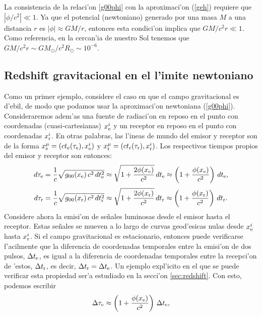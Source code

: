 La consistencia de la relaci'on \eqref{g00phi} con la aproximaci'on (\ref{geh}) requiere que $|{\phi}/{c^2}|\ll 1$. Ya que el potencial (newtoniano) generado por una masa $M$ a una distancia $r$ es $|\phi|\approx {GM}/{r}$, entonces esta condici'on implica que ${GM}/{c^2r}\ll 1$. Como referencia, en la cercan'ia de nuestro Sol tenemos que ${GM}/{c^2r}\sim {GM_\odot}{/c^2R_\odot}\sim 10^{-6}$.


\subsection{Redshift gravitacional en el l'imite newtoniano}\label{zg1}

Como un primer ejemplo, considere el caso en que el campo gravitacional es d'ebil, de modo que podamos usar la aproximaci'on newtoniana (\ref{g00phi}). Consideraremos adem'as una fuente de radiaci'on en reposo en el punto con coordenadas (cuasi-cartesianas) $x^i_{\rm e}$ y un receptor en reposo en el punto con coordenadas $x^i_{\rm r}$. En otras palabras, las l'ineas de mundo del emisor y receptor son de la forma $x^\mu_{\rm e}=(ct_{\rm e}(\tau_{\rm e}),x^i_{\rm e})$ y $x^\mu_{\rm r}=(ct_{\rm r}(\tau_{\rm r}),x^i_{\rm r})$. Los respectivos tiempos propios del emisor y receptor son entonces:
\begin{equation}
 d\tau_{\rm e}=\frac{1}{c}\sqrt{g_{00}(x_{\rm e})\,c^2\,dt^2_{\rm e}}\approx \sqrt{1+\frac{2\phi(x_{\rm e})}{c^2}}\,dt_{\rm e}\approx \left(1+\frac{\phi(x_{\rm e})}{c^2}\right)\,dt_{\rm e},
\end{equation}
\begin{equation}
 d\tau_{\rm r}=\frac{1}{c}\sqrt{g_{00}(x_{\rm r})\,c^2\,dt^2_{\rm r}}\approx \sqrt{1+\frac{2\phi(x_{\rm r})}{c^2}}\,dt_{\rm r}\approx \left(1+\frac{\phi(x_{\rm r})}{c^2}\right)\,dt_{\rm r}.
\end{equation}
Considere ahora la emisi'on de se\~nales luminosas desde el emisor hasta el receptor. Estas se\~nales se mueven a lo largo de curvas geod'esicas nulas desde $x^i_{\rm e}$ hasta $x^i_{\rm r}$. Si el campo gravitacional es estacionario, entonces puede verificarse f'acilmente que la diferencia de coordenadas temporales entre la emisi'on de dos pulsos, $ \Delta t_{\rm e}$, es igual a la diferencia de coordenadas temporales entre la recepci'on de 'estos, $ \Delta t_{\rm r}$, es decir, $ \Delta t_{\rm r}= \Delta t_{\rm e}$. Un ejemplo expl'icito en el que se puede verificar esta propiedad ser'a estudiado en la secci'on \ref{sec:redshift}. Con esto, podemos escribir
\begin{equation}
 \Delta\tau_{\rm e}\approx \left(1+\frac{\phi(x_{\rm e})}{c^2}\right)\, \Delta t_{\rm e},
\end{equation}
